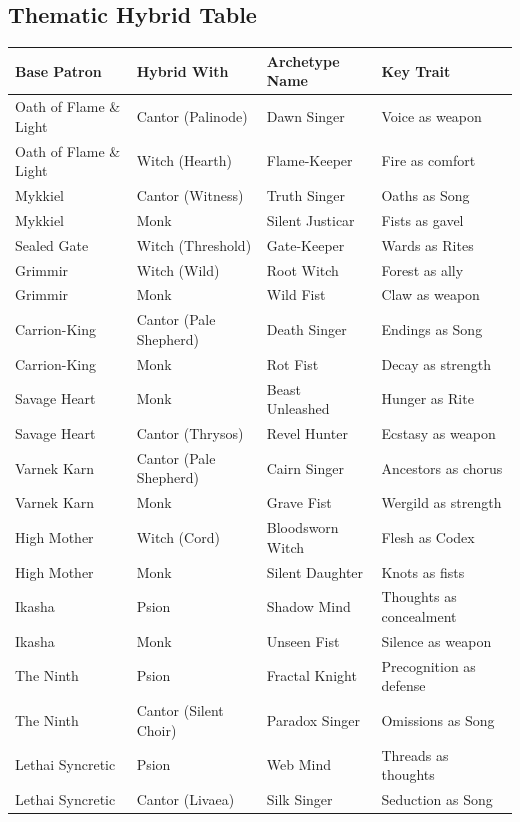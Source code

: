 \subsection{Thematic Hybrid Table}

\begin{longtable}{|p{}|p{}|p{}|p{}|}
\hline
\textbf{Base Patron} & \textbf{Hybrid With} & \textbf{Archetype Name} & \textbf{Key Trait} \\
\hline
Oath of Flame \& Light & Cantor (Palinode) & Dawn Singer & Voice as weapon \\
Oath of Flame \& Light & Witch (Hearth) & Flame-Keeper & Fire as comfort \\
Mykkiel & Cantor (Witness) & Truth Singer & Oaths as Song \\
Mykkiel & Monk & Silent Justicar & Fists as gavel \\
Sealed Gate & Witch (Threshold) & Gate-Keeper & Wards as Rites \\
Grimmir & Witch (Wild) & Root Witch & Forest as ally \\
Grimmir & Monk & Wild Fist & Claw as weapon \\
Carrion-King & Cantor (Pale Shepherd) & Death Singer & Endings as Song \\
Carrion-King & Monk & Rot Fist & Decay as strength \\
Savage Heart & Monk & Beast Unleashed & Hunger as Rite \\
Savage Heart & Cantor (Thrysos) & Revel Hunter & Ecstasy as weapon \\
Varnek Karn & Cantor (Pale Shepherd) & Cairn Singer & Ancestors as chorus \\
Varnek Karn & Monk & Grave Fist & Wergild as strength \\
High Mother & Witch (Cord) & Bloodsworn Witch & Flesh as Codex \\
High Mother & Monk & Silent Daughter & Knots as fists \\
Ikasha & Psion & Shadow Mind & Thoughts as concealment \\
Ikasha & Monk & Unseen Fist & Silence as weapon \\
The Ninth & Psion & Fractal Knight & Precognition as defense \\
The Ninth & Cantor (Silent Choir) & Paradox Singer & Omissions as Song \\
Lethai Syncretic & Psion & Web Mind & Threads as thoughts \\
Lethai Syncretic & Cantor (Livaea) & Silk Singer & Seduction as Song \\
\hline
\end{longtable}


